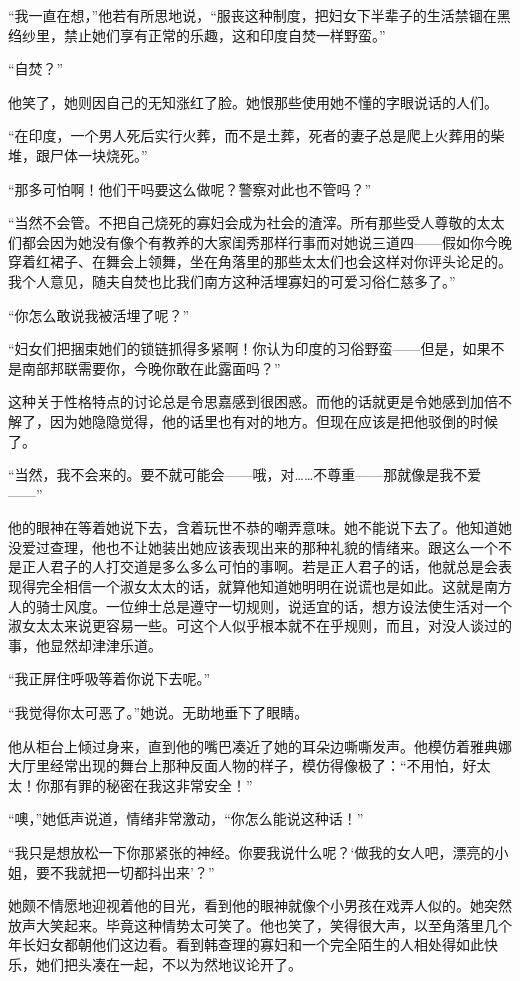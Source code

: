 \par “我一直在想，”他若有所思地说，“服丧这种制度，把妇女下半辈子的生活禁锢在黑绉纱里，禁止她们享有正常的乐趣，这和印度自焚一样野蛮。”
\par “自焚？”
\par 他笑了，她则因自己的无知涨红了脸。她恨那些使用她不懂的字眼说话的人们。
\par “在印度，一个男人死后实行火葬，而不是土葬，死者的妻子总是爬上火葬用的柴堆，跟尸体一块烧死。”
\par “那多可怕啊！他们干吗要这么做呢？警察对此也不管吗？”
\par “当然不会管。不把自己烧死的寡妇会成为社会的渣滓。所有那些受人尊敬的太太们都会因为她没有像个有教养的大家闺秀那样行事而对她说三道四——假如你今晚穿着红裙子、在舞会上领舞，坐在角落里的那些太太们也会这样对你评头论足的。我个人意见，随夫自焚也比我们南方这种活埋寡妇的可爱习俗仁慈多了。”
\par “你怎么敢说我被活埋了呢？”
\par “妇女们把捆束她们的锁链抓得多紧啊！你认为印度的习俗野蛮——但是，如果不是南部邦联需要你，今晚你敢在此露面吗？”
\par 这种关于性格特点的讨论总是令思嘉感到很困惑。而他的话就更是令她感到加倍不解了，因为她隐隐觉得，他的话里也有对的地方。但现在应该是把他驳倒的时候了。
\par “当然，我不会来的。要不就可能会——哦，对……不尊重——那就像是我不爱——”
\par 他的眼神在等着她说下去，含着玩世不恭的嘲弄意味。她不能说下去了。他知道她没爱过查理，他也不让她装出她应该表现出来的那种礼貌的情绪来。跟这么一个不是正人君子的人打交道是多么多么可怕的事啊。若是正人君子的话，他就总是会表现得完全相信一个淑女太太的话，就算他知道她明明在说谎也是如此。这就是南方人的骑士风度。一位绅士总是遵守一切规则，说适宜的话，想方设法使生活对一个淑女太太来说更容易一些。可这个人似乎根本就不在乎规则，而且，对没人谈过的事，他显然却津津乐道。
\par “我正屏住呼吸等着你说下去呢。”
\par “我觉得你太可恶了。”她说。无助地垂下了眼睛。
\par 他从柜台上倾过身来，直到他的嘴巴凑近了她的耳朵边嘶嘶发声。他模仿着雅典娜大厅里经常出现的舞台上那种反面人物的样子，模仿得像极了：“不用怕，好太太！你那有罪的秘密在我这非常安全！”
\par “噢，”她低声说道，情绪非常激动，“你怎么能说这种话！”
\par “我只是想放松一下你那紧张的神经。你要我说什么呢？‘做我的女人吧，漂亮的小姐，要不我就把一切都抖出来’？”
\par 她颇不情愿地迎视着他的目光，看到他的眼神就像个小男孩在戏弄人似的。她突然放声大笑起来。毕竟这种情势太可笑了。他也笑了，笑得很大声，以至角落里几个年长妇女都朝他们这边看。看到韩查理的寡妇和一个完全陌生的人相处得如此快乐，她们把头凑在一起，不以为然地议论开了。

